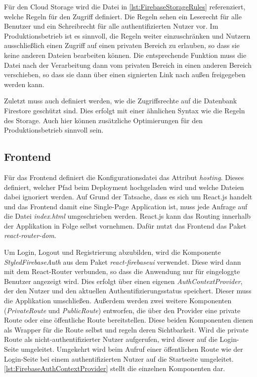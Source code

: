Für den Cloud Storage wird die Datei in \autoref{lst:FirebaseStorageRules} referenziert, welche Regeln für den Zugriff definiert. Die Regeln sehen ein Leserecht für alle Benutzer und ein Schreibrecht für alle authentifizierten Nutzer vor. Im Produktionsbetrieb ist es sinnvoll, die Regeln weiter einzuschränken und Nutzern ausschließlich einen Zugriff auf einen privaten Bereich zu erlauben, so dass sie keine anderen Dateien bearbeiten können. Die entsprechende Funktion muss die Datei nach der Verarbeitung dann vom privaten Bereich in einen anderen Bereich verschieben, so dass sie dann über einen signierten Link nach außen freigegeben werden kann.



Zuletzt muss auch definiert werden, wie die Zugriffsrechte auf die Datenbank Firestore geschützt sind. Dies erfolgt mit einer ähnlichen Syntax wie die Regeln des Storage. Auch hier können zusätzliche Optimierungen für den Produktionsbetrieb sinnvoll sein.

\subsection{Frontend}

Für das Frontend definiert die Konfigurationsdatei das Attribut \textit{hosting}. Dieses definiert, welcher Pfad beim Deployment hochgeladen wird und welche Dateien dabei ignoriert werden. Auf Grund der Tatsache, dass es sich um React.js handelt und das Frontend damit eine Single-Page Application ist, muss jede Anfrage auf die Datei \textit{index.html} umgeschrieben werden. React.js kann das Routing innerhalb der Applikation in Folge selbst vornehmen. Dafür nutzt das Frontend das Paket \textit{react-router-dom}.

Um Login, Logout und Registrierung abzubilden, wird die Komponente \textit{StyledFirebaseAuth} aus dem Paket \textit{react-firebaseui} verwendet. Diese wird dann mit dem React-Router verbunden, so dass die Anwendung nur für eingeloggte Benutzer angezeigt wird. Dies erfolgt über einen eigenen \textit{AuthContextProvider}, der den Nutzer und den aktuellen Authentifizierungsstatus speichert. Dieser muss die Applikation umschließen. Außerdem werden zwei weitere Komponenten (\textit{PrivateRoute} und \textit{PublicRoute}) entworfen, die über den Provider eine private Route oder eine öffentliche Route bereitstellen. Diese beiden Komponenten dienen als Wrapper für die Route selbst und regeln deren Sichtbarkeit. Wird die private Route als nicht-authentifizierter Nutzer aufgerufen, wird dieser auf die Login-Seite umgeleitet. Umgekehrt wird beim Aufruf einer öffentlichen Route wie der Login-Seite bei einem authentifizierten Nutzer auf die Startseite umgeleitet. \autoref{lst:FirebaseAuthContextProvider} stellt die einzelnen Komponenten dar.

